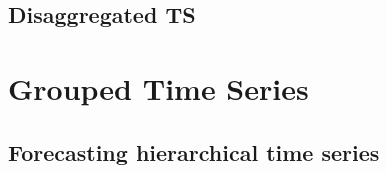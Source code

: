 \documentclass[c, dvipsnames]{beamer}  %
\begin{document}
%
%
%
%
%
%
%
%
%
%


\subsection{Disaggregated TS}

%
%
%
%
%
%


\section{Grouped Time Series}



\subsection{Forecasting hierarchical  time series}
\end{document}
